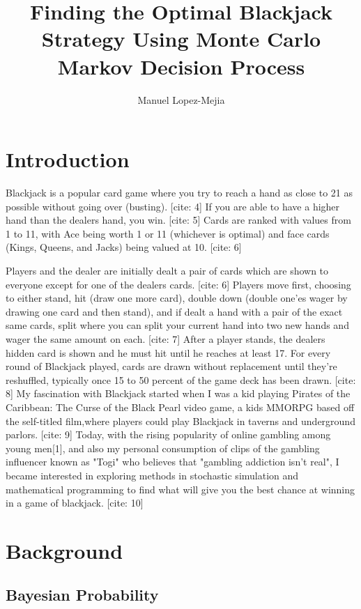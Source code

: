 \documentclass[12pt,a4paper]{cibb}
\title{\Large $\ $\\ \bf Finding the Optimal Blackjack Strategy Using Monte Carlo Markov Decision Process}
\author{\large Manuel Lopez-Mejia}
\begin{document}
\thispagestyle{myheadings}
\pagestyle{myheadings}


\section{Introduction}
\label{sec:SCIENTIFIC-BACKGROUND}

Blackjack is a popular card game where you try to reach a hand as close to 21 as possible without going over (busting). [cite: 4]
If you are able to have a higher hand than the dealers hand, you win. [cite: 5]
Cards are ranked with values from 1 to 11, with Ace being worth 1 or 11 (whichever is optimal) and face cards (Kings, Queens, and Jacks) being valued at 10. [cite: 6]

Players and the dealer are initially dealt a pair of cards which are shown to everyone except for one of the dealers cards. [cite: 6]
Players move first, choosing to either stand, hit (draw one more card), double down (double one'es wager by drawing one card and then stand), and if dealt a hand with a pair of the exact same cards, split where you can split your current hand into two new hands and wager the same amount on each. [cite: 7]
After a player stands, the dealers hidden card is shown and he must hit until he reaches at least 17. For every round of Blackjack played, cards are drawn without replacement until they're reshuffled, typically once 15 to 50 percent of the game deck has been drawn. [cite: 8]
My fascination with Blackjack started when I was a kid playing Pirates of the Caribbean: The Curse of the Black Pearl video game, a kids MMORPG based off the self-titled film,where players could play Blackjack in taverns and underground parlors. [cite: 9]
Today, with the rising popularity of online gambling among young men[1], and also my personal consumption of clips of the gambling influencer known as "Togi" who believes that "gambling addiction isn't real", I became interested in exploring methods in stochastic simulation and mathematical programming to find what will give you the best chance at winning in a game of blackjack. [cite: 10]

\section{Background}
\label{sec:Theory}

\subsection{Bayesian Probability}
\end{document}
